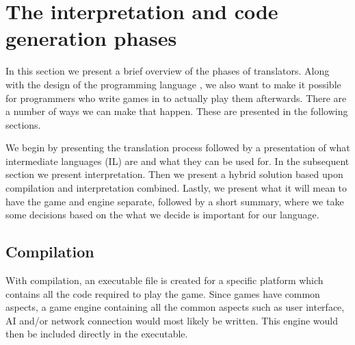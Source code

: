 \section{The interpretation and code generation phases}
\label{sec:codegenerationandinterpretation}

In this section we present a brief overview of the phases of
translators. Along with the design of the programming language
\productname{}, we also want to make it possible for programmers who
write games in \productname{} to actually play them afterwards. There
are a number of ways we can make that happen. These are presented in the
following sections.

We begin by presenting the translation process followed by a
presentation of what intermediate languages (IL) are and what they can
be used for. In the subsequent section we present interpretation. Then
we present a hybrid solution based upon compilation and interpretation
combined. Lastly, we present what it will mean to have the game and
engine separate, followed by a short summary, where we take some
decisions based on the what we decide is important for our language.



\subsection{Compilation}
\label{sec:compilation}
With compilation, an executable file is created for a specific platform
which contains all the code required to play the game. Since games have
common aspects, a game engine containing all the common aspects such
as user interface, AI and/or network connection would most likely be
written. This engine would then be included directly in the executable.

